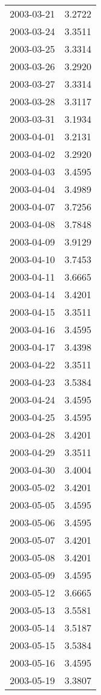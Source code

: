 \begin{tabular}{lr}
2003-03-21 &      3.2722 \\
2003-03-24 &      3.3511 \\
2003-03-25 &      3.3314 \\
2003-03-26 &      3.2920 \\
2003-03-27 &      3.3314 \\
2003-03-28 &      3.3117 \\
2003-03-31 &      3.1934 \\
2003-04-01 &      3.2131 \\
2003-04-02 &      3.2920 \\
2003-04-03 &      3.4595 \\
2003-04-04 &      3.4989 \\
2003-04-07 &      3.7256 \\
2003-04-08 &      3.7848 \\
2003-04-09 &      3.9129 \\
2003-04-10 &      3.7453 \\
2003-04-11 &      3.6665 \\
2003-04-14 &      3.4201 \\
2003-04-15 &      3.3511 \\
2003-04-16 &      3.4595 \\
2003-04-17 &      3.4398 \\
2003-04-22 &      3.3511 \\
2003-04-23 &      3.5384 \\
2003-04-24 &      3.4595 \\
2003-04-25 &      3.4595 \\
2003-04-28 &      3.4201 \\
2003-04-29 &      3.3511 \\
2003-04-30 &      3.4004 \\
2003-05-02 &      3.4201 \\
2003-05-05 &      3.4595 \\
2003-05-06 &      3.4595 \\
2003-05-07 &      3.4201 \\
2003-05-08 &      3.4201 \\
2003-05-09 &      3.4595 \\
2003-05-12 &      3.6665 \\
2003-05-13 &      3.5581 \\
2003-05-14 &      3.5187 \\
2003-05-15 &      3.5384 \\
2003-05-16 &      3.4595 \\
2003-05-19 &      3.3807 \\

\end{tabular}
